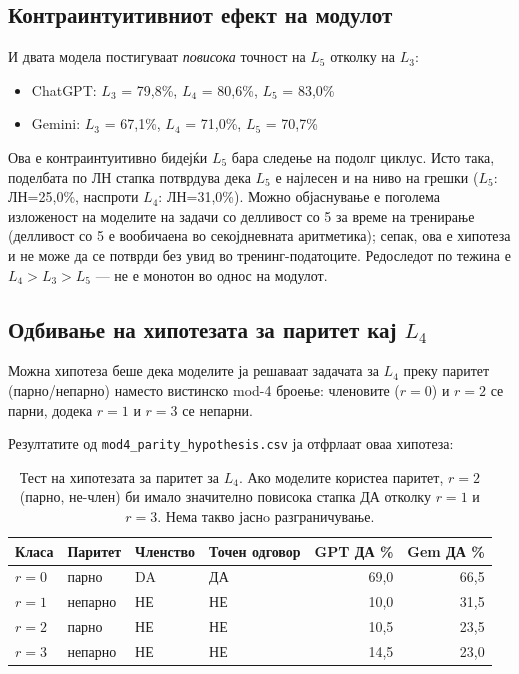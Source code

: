 \documentclass[12pt,a4paper]{article}
\theoremstyle{definition}
\begin{document}
\subsection{Контраинтуитивниот ефект на модулот}

И двата модела постигуваат \textit{повисока} точност на $L_5$ отколку на $L_3$:

\begin{itemize}
  \item ChatGPT: $L_3$ = 79,8\%, $L_4$ = 80,6\%, $L_5$ = 83,0\%
  \item Gemini: $L_3$ = 67,1\%, $L_4$ = 71,0\%, $L_5$ = 70,7\%
\end{itemize}

Ова е контраинтуитивно бидејќи $L_5$ бара следење на подолг циклус. Исто така, поделбата по ЛН стапка потврдува дека $L_5$ е најлесен и на ниво на грешки ($L_5$: ЛН=25,0\%, наспроти $L_4$: ЛН=31,0\%). Можно објаснување е поголема изложеност на моделите на задачи со делливост со 5 за време на тренирање (делливост со 5 е вообичаена во секојдневната аритметика); сепак, ова е хипотеза и не може да се потврди без увид во тренинг-податоците. Редоследот по тежина е $L_4 > L_3 > L_5$ --- не е монотон во однос на модулот.

\subsection{Одбивање на хипотезата за паритет кај $L_4$}

Можна хипотеза беше дека моделите ја решаваат задачата за $L_4$ преку паритет (парно/непарно) наместо вистинско mod-4 броење: членовите ($r=0$) и $r=2$ се парни, додека $r=1$ и $r=3$ се непарни.

Резултатите од \texttt{mod4\_parity\_hypothesis.csv} ја отфрлаат оваа хипотеза:

\begin{table}[H]
\centering
\begin{tabular}{llllrr}
\toprule
\textbf{Класа} & \textbf{Паритет} & \textbf{Членство} & \textbf{Точен одговор} & \textbf{GPT ДА \%} & \textbf{Gem ДА \%} \\
\midrule
$r=0$ & парно & DA  & ДА & 69,0 & 66,5 \\
$r=1$ & непарно & НЕ & НЕ & 10,0 & 31,5 \\
$r=2$ & парно   & НЕ & НЕ & 10,5 & 23,5 \\
$r=3$ & непарно & НЕ & НЕ & 14,5 & 23,0 \\
\bottomrule
\end{tabular}
\caption{Тест на хипотезата за паритет за $L_4$. Ако моделите користеа паритет, $r=2$ (парно, не-член) би имало значително повисока стапка ДА отколку $r=1$ и $r=3$. Нема такво јаснo разграничување.}
\end{table}
\end{document}
